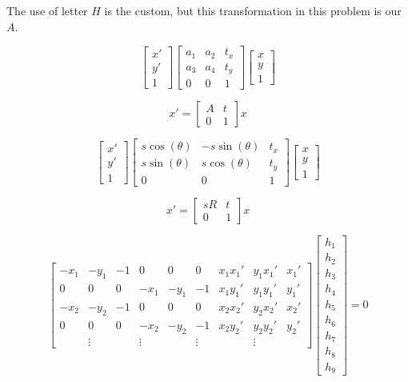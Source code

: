 \documentclass{article}
\begin{document}
The use of letter $H$ is the custom, but this transformation in this problem is
our $A$.

$$ 
\left[\begin{array}{r} x' \\ y' \\ 1 \end{array}\right]
\left[\begin{array}{rrr}
a_1 & a_2 & t_x \\ a_3 & a_4 & t_y \\ 0 & 0 & 1
\end{array}\right]
\left[\begin{array}{r} x \\ y \\ 1 \end{array}\right]
$$

$$ 
x' = \left[\begin{array}{rr} A & t \\ 0 & 1 \end{array}\right] x
$$


$$ 
\left[\begin{array}{r} x' \\ y' \\ 1 \end{array}\right]
\left[\begin{array}{rrr}
s\cos(\theta) & -s\sin(\theta) & t_x \\ 
s\sin(\theta) & s\cos(\theta) & t_y \\ 
0 & 0 & 1
\end{array}\right]
\left[\begin{array}{r} x \\ y \\ 1 \end{array}\right]
$$


$$ 
x' = \left[\begin{array}{rr}
sR & t \\ 0 & 1
\end{array}\right] x
$$


$$ 
\left[\begin{array}{rrrrrrrrr}
-x_1 & -y_1 & -1 & 0 & 0 & 0 & x_1x_1' & y_1x_1' & x_1' \\
0 & 0 & 0 & -x_1 & -y_1 & -1 & x_1y_1' & y_1y_1' & y_1' \\
-x_2 & -y_2 & -1 & 0 & 0 & 0 & x_2x_2' & y_2x_2' & x_2' \\
0 & 0 & 0 & -x_2 & -y_2 & -1 & x_2y_2' & y_2y_2' & y_2' \\
 &  \vdots &  &  \vdots &  & \vdots &  &  \vdots & 
\end{array}\right]
\left[\begin{array}{r}
h_1 \\ h_2 \\ h_3 \\ h_4 \\ h_5 \\ h_6 \\ h_7 \\ h_8 \\ h_9 
\end{array}\right] = 0
$$
\end{document}
